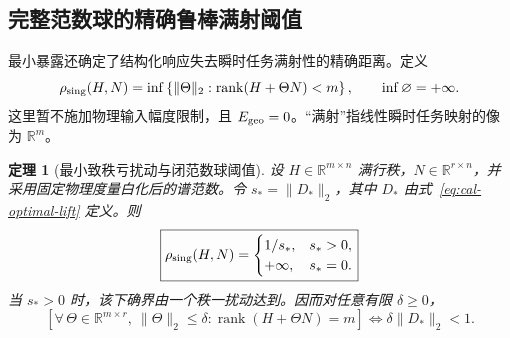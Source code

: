 \documentclass[11pt,a4paper]{article}
\numberwithin{equation}{section}
\newtheorem{theorem}{定理}[section]
\theoremstyle{definition}
\begin{document}
\subsection{完整范数球的精确鲁棒满射阈值}
\label{rev:sec:surjectivity}

最小暴露还确定了结构化响应失去瞬时任务满射性的精确距离。定义
\begin{equation}
 \rho_{\rm sing}(H,N)
 =
 \inf\left\{
 \|\Theta\|_2:
 \operatorname{rank}(H+\Theta N)<m
 \right\},
 \qquad \inf\varnothing=+\infty .
 \label{rev:eq:sing-radius}
\end{equation}
这里暂不施加物理输入幅度限制，且 $E_{\rm geo}=0$。“满射”指线性瞬时任务映射的像为 $\mathbb R^m$。

\begin{theorem}[最小致秩亏扰动与闭范数球阈值]
\label{rev:thm:robust-surjectivity}
设 $H\in\mathbb R^{m\times n}$ 满行秩，$N\in\mathbb R^{r\times n}$，并采用固定物理度量白化后的谱范数。令 $s_*=\|D_*\|_2$，其中 $D_*$ 由式~\eqref{eq:cal-optimal-lift} 定义。则
\begin{equation}
 \boxed{
 \rho_{\rm sing}(H,N)=
 \begin{cases}
  1/s_*,&s_*>0,\\
  +\infty,&s_*=0.
 \end{cases}}
 \label{rev:eq:exact-sing-radius}
\end{equation}
当 $s_*>0$ 时，该下确界由一个秩一扰动达到。因而对任意有限 $\delta\ge0$，
\begin{equation}
 \boxed{
 \left[
 \forall\,\Theta\in\mathbb R^{m\times r},\
 \|\Theta\|_2\le\delta:
 \operatorname{rank}(H+\Theta N)=m
 \right]
 \iff
 \delta\|D_*\|_2<1.}
 \label{rev:eq:robust-rank-iff}
\end{equation}
\end{theorem}
\end{document}
